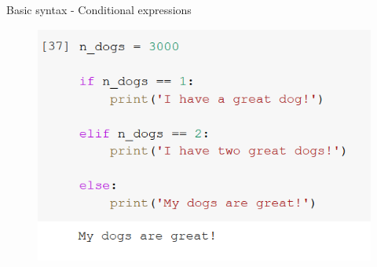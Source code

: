 \documentclass[aspectratio=169]{beamer}
\begin{document}
\begin{frame}{Basic syntax - Conditional expressions}
\begin{multicols}{3}
\begin{figure}
			\includegraphics[width=\linewidth]{img/else.png}
		\end{figure}

	\end{multicols}

\end{frame}
\end{document}
